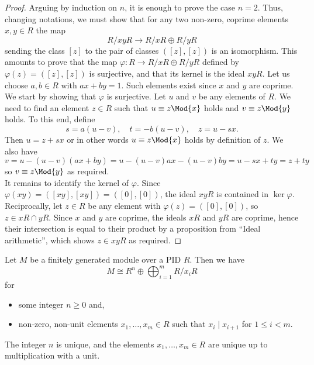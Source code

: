 \documentclass[12pt, a4paper]{article}
\begin{document}
\begin{proof}
    Arguing by induction on \( n \), it is enough to prove the case \( n = 2 \). Thus, changing notations, we must show that for any two non-zero, coprime elements \( x, y \in R \) the map
    \[ R/xyR \longrightarrow R/xR \oplus R/yR \]
    sending the class \( [z] \) to the pair of classes \( ([z], [z]) \) is an isomorphism. This amounts to prove that the map \( \varphi \colon R \to R/xR \oplus R/yR \) defined by \( \varphi(z) = ([z], [z]) \) is surjective, and that its kernel is the ideal \( xyR \). Let us choose \( a, b \in R \) with \( ax + by = 1 \). Such elements exist since \( x \) and \( y \) are coprime. \\
    We start by showing that \( \varphi \) is surjective. Let \( u \) and \( v \) be any elements of \( R \). We need to find an element \( z \in R \) such that \( u \equiv z \Mod{x} \) holds and \( v \equiv z \Mod{y} \) holds. To this end, define
    \[ s = a(u - v), \quad t = -b(u - v), \quad z = u - sx. \]
    Then \( u = z + sx \) or in other words \( u \equiv z \Mod{x} \) holds by definition of \( z \). We also have
    \[ v = u - (u - v)(ax + by) = u - (u - v)ax - (u - v)by = u - sx + ty = z + ty \]
    so \( v \equiv z \Mod{y} \) as required. \\
    It remains to identify the kernel of \( \varphi \). Since \( \varphi(xy) = ([xy], [xy]) = ([0], [0]) \), the ideal \( xyR \) is contained in \( \ker \varphi \). Reciprocally, let \( z \in R \) be any element with \( \varphi(z) = ([0], [0]) \), so \( z \in xR \cap yR \). Since \( x \) and \( y \) are coprime, the ideals \( xR \) and \( yR \) are coprime, hence their intersection is equal to their product by a proposition from ``Ideal arithmetic'', which shows \( z \in xyR \) as required.
\end{proof}

\begin{mdthm}
    Let \(M\) be a finitely generated module over a PID \(R\). Then we have 
    \[M \cong R^n \oplus \bigoplus_{i=1}^m R/x_iR\]
    for 
    \begin{itemize}
        \item some integer \(n\geq 0\) and,
        \item non-zero, non-unit elements \(x_1,\ldots,x_m \in R\) such that \(x_i \mid x_{i+1}\) for \(1 \leq i <m\).
    \end{itemize}
    The integer \(n\) is unique, and the elements \(x_1,\ldots,x_m \in R\) are unique up to multiplication with a unit.
\end{mdthm}
\end{document}
